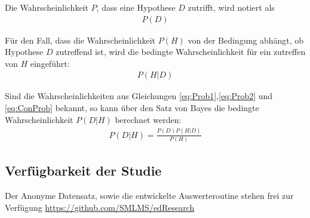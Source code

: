 \noindent
Die Wahrscheinlichkeit $P$, dass eine Hypothese $D$ zutrifft, wird notiert als
\begin{align}
\label{eq:Prob2}
	P(D)
\end{align}

\noindent
Für den Fall, dass die Wahrscheinlichkeit $P(H)$ von der Bedingung abhängt, ob Hypothese $D$ zutreffend ist, wird die bedingte Wahrscheinlichkeit für ein zutreffen von $H$ eingeführt:
\begin{align}
\label{eq:ConProb}
	P(H|D)
\end{align}

\noindent
Sind die Wahrscheinlichkeiten aus Gleichungen \eqref{eq:Prob1},\eqref{eq:Prob2} und \eqref{eq:ConProb} bekannt, so kann über den Satz von Bayes die bedingte Wahrscheinlichkeit $P(D|H)$ berechnet werden:
\begin{align}
\label{eq:Bayes}
	P(D|H) = \frac{P(D)P(H|D)}{P(H)}
\end{align}

\subsection{Verfügbarkeit der Studie}
Der Anonyme Datensatz, sowie die entwickelte Auswerteroutine stehen frei zur Verfügung \url{https://github.com/SMLMS/edResearch} 